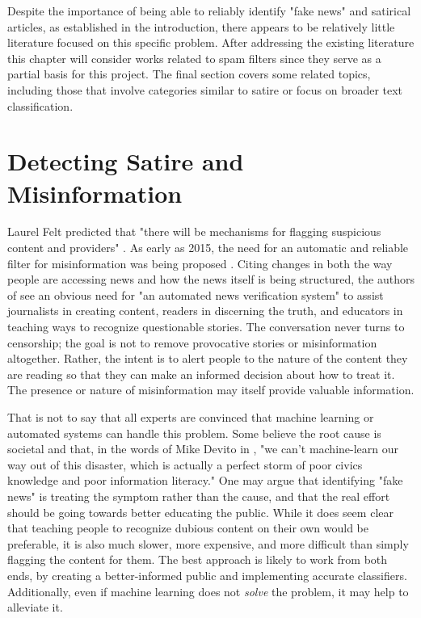 \documentclass [12 pt] {report}
\begin{document}
Despite the importance of being able to reliably identify "fake news" and satirical articles, as established in the introduction, there appears to be relatively little literature focused on this specific problem. After addressing the existing literature this chapter will consider works related to spam filters since they serve as a partial basis for this project. The final section covers some related topics, including those that involve categories similar to satire or focus on broader text classification.

\section{Detecting Satire and Misinformation}
Laurel Felt predicted that "there will be mechanisms for flagging suspicious content and providers" \cite{quotes}. As early as 2015, the need for an automatic and reliable filter for misinformation was being proposed \cite{crapDetector}. Citing changes in both the way people are accessing news and how the news itself is being structured, the authors of \cite{crapDetector} see an obvious need for "an automated news verification system" to assist journalists in creating content, readers in discerning the truth, and educators in teaching ways to recognize questionable stories. The conversation never turns to censorship; the goal is not to remove provocative stories or misinformation altogether. Rather, the intent is to alert people to the nature of the content they are reading so that they can make an informed decision about how to treat it. The presence or nature of misinformation may itself provide valuable information. 

That is not to say that all experts are convinced that machine learning or automated systems can handle this problem. Some believe the root cause is societal and that, in the words of Mike Devito in \cite{quotes}, "we can't machine-learn our way out of this disaster, which is actually a perfect storm of poor civics knowledge and poor information literacy." One may argue that identifying "fake news" is treating the symptom rather than the cause, and that the real effort should be going towards better educating the public. While it does seem clear that teaching people to recognize dubious content on their own would be preferable, it is also much slower, more expensive, and more difficult than simply flagging the content for them. The best approach is likely to work from both ends, by creating a better-informed public and implementing accurate classifiers. Additionally, even if machine learning does not \textit{solve} the problem, it may help to alleviate it.
\end{document}
